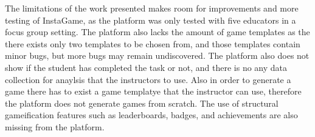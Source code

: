 The limitations of the work presented makes room for improvements and more testing of InstaGame, as the platform was only tested with five educators in a focus group setting. The platform also lacks the amount of game templates as the there exists only two templates to be chosen from, and those templates contain minor bugs, but more bugs may remain undiscovered. The platform also does not show if the student has completed the task or not, and there is no any data collection for anaylsis that the instructors to use. Also in order to generate a game there has to exist a game templatye that the instructor can use, therefore the platform does not generate games from scratch. The use of structural gameification features such as leaderboards, badges, and achievements are also missing from the platform.